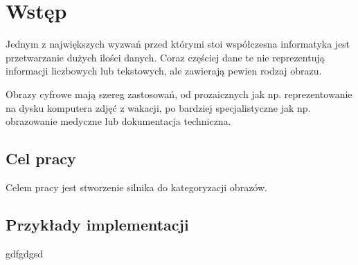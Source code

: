 \chapter*{Wstęp}

Jednym z największych wyzwań przed którymi stoi współczesna informatyka jest przetwarzanie dużych ilości danych. Coraz częściej dane te nie reprezentują informacji liczbowych lub tekstowych, ale zawierają pewien rodzaj obrazu. 

Obrazy cyfrowe mają szereg zastosowań, od prozaicznych jak np. reprezentowanie na dysku komputera zdjęć z wakacji, po bardziej specjalistyczne jak np. obrazowanie medyczne lub dokumentacja techniczna.

\section*{Cel pracy}
Celem pracy jest stworzenie silnika do kategoryzacji obrazów.

\section*{Przykłady implementacji}
gdfgdgsd